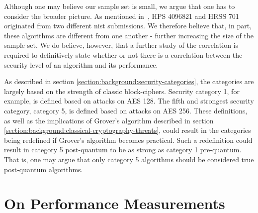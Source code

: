 Although one may believe our sample set is small, we argue that one has to consider the broader picture. As mentioned in~\cite{ntru2020}, HPS 4096821 and HRSS 701 originated from two different \gls{nist} submissions. We therefore believe that, in part, these algorithms are different from one another - further increasing the size of the sample set. We do believe, however, that a further study of the correlation is required to definitively state whether or not there is a correlation between the security level of an algorithm and its performance.

As described in section \ref{section:background:security-categories}, the categories are largely based on the strength of classic block-ciphers. Security category 1, for example, is defined based on attacks on AES 128. The fifth and strongest security category, category 5, is defined based on attacks on AES 256. These definitions, as well as the implications of Grover's algorithm described in section \ref{section:background:classical-cryptography-threats}, could result in the categories being redefined if Grover's algorithm becomes practical. Such a redefinition could result in category 5 post-quantum to be as strong as category 1 pre-quantum. That is, one may argue that only category 5 algorithms should be considered true post-quantum algorithms.

\section{On Performance Measurements}
\label{section:discussion:performance-measurements}

